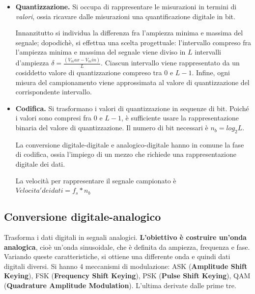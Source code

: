 \begin{itemize}
                \item
                    \textbf{Quantizzazione.} Si occupa di rappresentare le misurazioni in termini di \textit{valori}, ossia ricavare dalle misurazioni una quantificazione digitale in bit.
                    
                    Innanzitutto si individua la differenza fra l'ampiezza minima e massima del segnale; dopodichè, si effettua una scelta progettuale: l'intervallo compreso fra l'ampiezza minima e massima del segnale viene diviso in $L$ intervalli d'ampiezza $\delta = \frac{(V_max - V_min)}{L}$. Ciascun intervallo viene rappresentato da un cosiddetto valore di quantizzazione compreso tra $0$ e $L-1$. Infine, ogni misura del campionamento viene approssimata al valore di quantizzazione del corrispondente intervallo.
                
                \item
                    \textbf{Codifica.} Si trasformano i valori di quantizzazione in sequenze di bit. Poiché i valori sono compresi fra $0$ e $L-1$, è sufficiente usare la rappresentazione binaria del valore di quantizzazione. Il numero di bit necessari è $n_b = log_2 L$.
                    
                     La conversione digitale-digitale e analogico-digitale hanno in comune la fase di codifica, ossia l'impiego di un mezzo che richiede una rappresentazione digitale dei dati.
                    
                    La velocità per rappresentare il segnale campionato è $Velocita' dei dati = f_s * n_b$
            \end{itemize}
            
    \subsection{Conversione digitale-analogico}
    
        Trasforma i dati digitali in segnali analogici. \textbf{L'obiettivo è costruire un'onda analogica}, cioè un'onda sinusoidale, che è definita da ampiezza, frequenza e fase. Variando queste caratteristiche, si ottiene una differente onda e quindi dati digitali diversi. Si hanno 4 meccanismi di modulazione: ASK (\textbf{Amplitude Shift Keying}), FSK (\textbf{Frequency Shift Keying}), PSK (\textbf{Pulse Shift Keying}), QAM (\textbf{Quadrature Amplitude Modulation}). L'ultima derivate dalle prime tre.
        
        \vspace{3mm}
        
